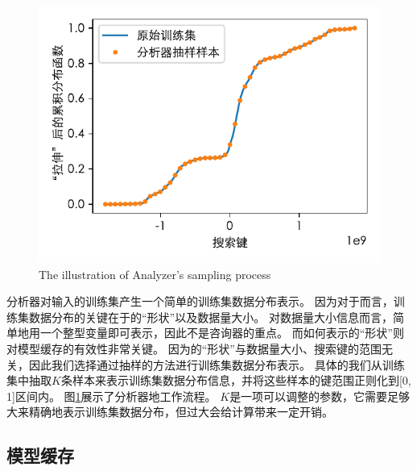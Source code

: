 \begin{figure}[!htp]
  \centering
  \includegraphics{figure/analyzer.pdf}
    {The illustration of Analyzer's sampling process}
  \label{fig:analyzer}
\end{figure}

分析器对输入的训练集产生一个简单的训练集数据分布表示。
因为对于{\li}而言，训练集数据分布的关键在于{\cdf}的“形状”以及数据量大小。
对数据量大小信息而言，简单地用一个整型变量即可表示，因此不是咨询器的重点。
而如何表示{\cdf}的“形状”则对模型缓存的有效性非常关键。
因为{\cdf}的“形状”与数据量大小、搜索键的范围无关，因此我们选择通过抽样的方法进行训练集数据分布表示。
具体的我们从训练集中抽取$K$条样本来表示训练集数据分布信息，并将这些样本的键范围正则化到[0, 1]区间内。
图\ref{fig:analyzer}展示了分析器地工作流程。
$K$是一项可以调整的参数，它需要足够大来精确地表示训练集数据分布，但过大会给计算带来一定开销。


\subsection{模型缓存}

